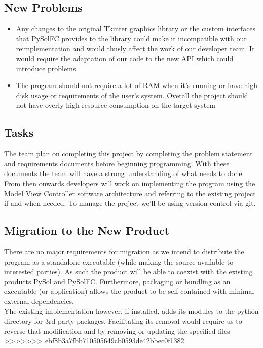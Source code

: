 \documentclass{article}
\begin{document}
		\subsection{New Problems}
		\begin{itemize}
		\itemsep0em	
			\item Any changes to the original Tkinter graphics library or the 
			custom interfaces that PySolFC provides to the library could make it
			incompatible with our reimplementation and would thusly affect the work of
			our developer team. It would require the adaptation of our code to the new
			API which could introduce problems
			\item The program should not require a lot of RAM when it’s running or
			have high disk usage or requirements of the user’s system. Overall the
			project should not have overly high resource consumption on the target system\\
		\end{itemize}
		\subsection{Tasks}
			\indent The team plan on completing this project by completing the problem
			statement and requirements documents before beginning programming. With these
			documents the team will have a strong understanding of what needs to done.
			From then onwards developers will work on implementing the program using
			the Model View Controller software architecture and referring to the existing
			project if and when needed. To manage the project we’ll be using version
			control via git.\\


		\subsection{Migration to the New Product}
			\indent There are no major requirements for migration as we intend to
			distribute the program as a standalone executable (while making the source
			available to interested parties). As such the product will be able to coexist
			with the existing products PySol and PySolFC. Furthermore, packaging
			or bundling as an executable (or application) allows the product to be
			self-contained with minimal external dependencies.\\
			\indent Yhe existing implementation however, if installed, adds its modules
			to the python directory for 3rd party packages. Facilitating its removal
			would require us to reverse that modification and by removing or updating
			the specified files\\
>>>>>>> ebf8b3a7fbb710505649cb0593de42bbec0f1382
\end{document}
